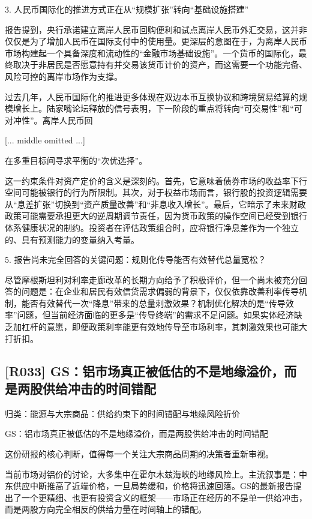 \documentclass[11pt]{ctexart}
\begin{document}
3. 人民币国际化的推进方式正在从“规模扩张”转向“基础设施搭建”

报告提到，央行承诺建立离岸人民币回购便利和试点离岸人民币外汇交易，这并非仅仅是为了增加人民币在国际支付中的使用量。更深层的意图在于，为离岸人民币市场构建起一个具备深度和流动性的“金融市场基础设施”。一个货币的国际化，最终取决于非居民是否愿意持有并交易该货币计价的资产，而这需要一个功能完备、风险可控的离岸市场作为支撑。

过去几年，人民币国际化的推进更多体现在双边本币互换协议和跨境贸易结算的规模增长上。陆家嘴论坛释放的信号表明，下一阶段的重点将转向“可交易性”和“可对冲性”。离岸人民币回

[... middle omitted ...]

在多重目标间寻求平衡的“次优选择”。

这一约束条件对资产定价的含义是深刻的。首先，它意味着债券市场的收益率下行空间可能被银行的行为所限制。其次，对于权益市场而言，银行股的投资逻辑需要从“息差扩张”切换到“资产质量改善”和“非息收入增长”。最后，它暗示了未来财政政策可能需要承担更大的逆周期调节责任，因为货币政策的操作空间已经受到银行体系健康状况的制约。投资者在评估政策组合时，应将银行净息差作为一个独立的、具有预测能力的变量纳入考量。

5. 报告尚未完全回答的关键问题：规则化传导能否有效替代总量宽松？

尽管摩根斯坦利对利率走廊改革的长期方向给予了积极评价，但一个尚未被充分回答的问题是：在企业和居民有效信贷需求偏弱的背景下，仅仅依靠改善利率传导机制，能否有效替代一次“降息”带来的总量刺激效果？机制优化解决的是“传导效率”问题，但当前经济面临的更多是“传导终端”的需求不足问题。如果实体经济缺乏加杠杆的意愿，即便政策利率能更有效地传导至市场利率，其刺激效果也可能大打折扣。

\subsection{[R033] GS：铝市场真正被低估的不是地缘溢价，而是两股供给冲击的时间错配}
{\small\color{refgray}归类：能源与大宗商品：供给约束下的时间错配与地缘风险折价}

GS：铝市场真正被低估的不是地缘溢价，而是两股供给冲击的时间错配

这份研报的核心判断，值得每一个关注大宗商品周期的决策者重新审视。

当前市场对铝价的讨论，大多集中在霍尔木兹海峡的地缘风险上。主流叙事是：中东供应中断推高了近端价格，一旦局势缓和，价格将迅速回落。GS的最新报告提出了一个更精细、也更有投资含义的框架——市场正在经历的不是单一供给冲击，而是两股方向完全相反的供给力量在时间轴上的错配。
\end{document}
